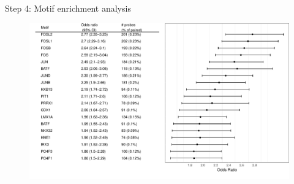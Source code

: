 \documentclass[slidestop,compress,11pt,xcolor=dvipsnames]{beamer}
\begin{document}
\begin{frame}{Step 4: Motif enrichment analysis}
  \vspace{-0.5cm} 
  \begin{figure}
  \hspace*{-1cm} 
  \includegraphics[width=1.1\linewidth]{ELMER/motif_enrichment.pdf}
 \end{figure}
\end{frame}



\end{document}
